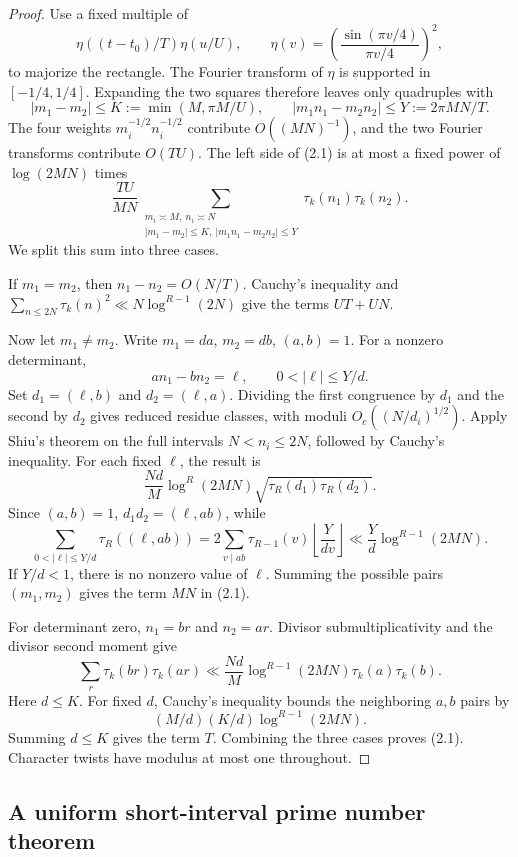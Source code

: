 \documentclass[11pt]{article}
\theoremstyle{remark}
\newcommand{\1}{\mathbf 1}
\begin{document}
\begin{proof}
Use a fixed multiple of
\[
 \eta((t-t_0)/T)\eta(u/U),\qquad
 \eta(v)=\left(\frac{\sin(\pi v/4)}{\pi v/4}\right)^2,
\]
to majorize the rectangle.  The Fourier transform of $\eta$ is supported in
$[-1/4,1/4]$.  Expanding the two squares therefore leaves only quadruples with
\[
 |m_1-m_2|\le K:=\min(M,\pi M/U),\qquad
 |m_1n_1-m_2n_2|\le Y:=2\pi MN/T.
\]
The four weights \(m_i^{-1/2}n_i^{-1/2}\) contribute \(O((MN)^{-1})\), and
the two Fourier transforms contribute \(O(TU)\).  The left side of
(2.1) is at most a fixed power of \(\log(2MN)\) times
\[
 \frac{TU}{MN}
 \sum_{\substack{m_i\asymp M,\ n_i\asymp N\\
 |m_1-m_2|\le K,\ |m_1n_1-m_2n_2|\le Y}}
 \tau_k(n_1)\tau_k(n_2).                               \tag{2.2}
\]
We split this sum into three cases.

If $m_1=m_2$, then $n_1-n_2=O(N/T)$.  Cauchy's inequality and
$\sum_{n\le2N}\tau_k(n)^2\ll N\log^{R-1}(2N)$ give the terms $UT+UN$.

Now let $m_1\ne m_2$.  Write $m_1=da$, $m_2=db$, $(a,b)=1$.
For a nonzero determinant,
\[
 an_1-bn_2=\ell,\qquad0<|\ell|\le Y/d.
\]
Set \(d_1=(\ell,b)\) and \(d_2=(\ell,a)\).  Dividing the first congruence by
\(d_1\) and the second by \(d_2\) gives reduced residue classes, with moduli
\(O_c((N/d_i)^{1/2})\).  Apply Shiu's theorem
\cite[Theorem~1]{Shiu1980} on the full intervals \(N<n_i\le2N\), followed by
Cauchy's inequality.  For each fixed \(\ell\), the result is
\[
 \frac{Nd}{M}\log^{R}(2MN)
 \sqrt{\tau_R(d_1)\tau_R(d_2)}.
\]
Since $(a,b)=1$, $d_1d_2=(\ell,ab)$, while
\[
 \sum_{0<|\ell|\le Y/d}\tau_R((\ell,ab))
 =2\sum_{v\mid ab}\tau_{R-1}(v)\left\lfloor\frac{Y}{dv}\right\rfloor
 \ll\frac Yd\log^{R-1}(2MN).                           \tag{2.3}
\]
If $Y/d<1$, there is no nonzero value of \(\ell\).
Summing the possible pairs \((m_1,m_2)\) gives the term $MN$ in (2.1).

For determinant zero, $n_1=br$ and $n_2=ar$.  Divisor
submultiplicativity and the divisor second moment give
\[
 \sum_r\tau_k(br)\tau_k(ar)
 \ll\frac{Nd}{M}\log^{R-1}(2MN)\tau_k(a)\tau_k(b).
\]
Here $d\le K$.  For fixed $d$, Cauchy's inequality bounds the neighboring
$a,b$ pairs by
\[
 (M/d)(K/d)\log^{R-1}(2MN).
\]
Summing $d\le K$ gives the term $T$.  Combining the three cases proves
(2.1).  Character twists have modulus at most one throughout.
\end{proof}

\subsection{A uniform short-interval prime number theorem}
\end{document}
